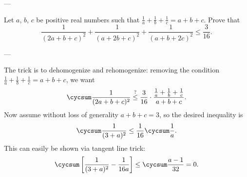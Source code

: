 
---

Let $a$, $b$, $c$ be positive real numbers such that $\frac1a+\frac1b+\frac1c=a+b+c$. Prove that
\[\frac1{(2a+b+c)^2}+\frac1{(a+2b+c)^2}+\frac1{(a+b+2c)^2}\le\frac3{16}.\]

---

The trick is to dehomogenize and rehomogenize: removing the condition $\tfrac1a+\tfrac1b+\tfrac1c=a+b+c$, we want \[\cycsum\frac1{(2a+b+c)^2}\stackrel?\le\frac3{16}\cdot\frac{\frac1a+\frac1b+\frac1c}{a+b+c}.\]
Now assume without loss of generality $a+b+c=3$, so the desired inequality is \[\cycsum\frac1{(3+a)^2}\le\frac1{16}\cycsum\frac1a.\]
This can easily be shown via tangent line trick: \[\cycsum\left[\frac1{(3+a)^2}-\frac1{16a}\right]\le\cycsum\frac{a-1}{32}=0.\]


